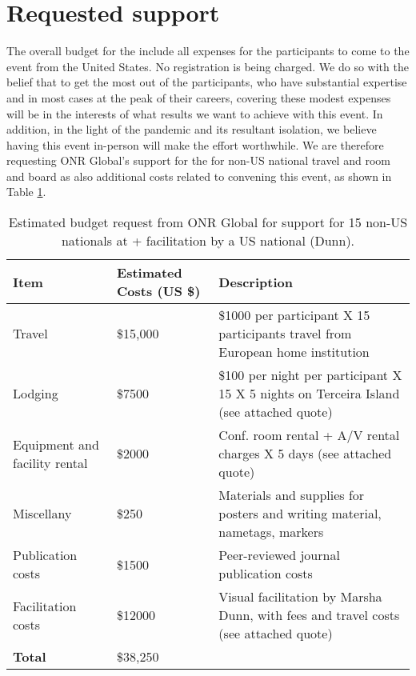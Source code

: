 \section{Requested  support}

The overall budget for the \symp include all expenses for the
participants to come to the event from the United States. No
registration is being charged. We do so with the belief that to get
the most out of the participants, who have substantial expertise and
in most cases at the peak of their careers, covering these modest
expenses will be in the interests of what results we want to achieve
with this event. In addition, in the light of the pandemic and its
resultant isolation, we believe having this event in-person will make
the effort worthwhile.  We are therefore requesting ONR Global's
support for the \symp for non-US national travel and room and board as
also additional costs related to convening this event, as shown in
Table \ref{tab:nsf-budget}.

\begin{table}[!h]
  \footnotesize{
    \centering    
    \begin{tabular}{|p{3.0cm}|p{1.6cm}|p{10cm}|}
      \hline 
      \rowcolor{Gray}
      \bfseries Item& \bfseries Estimated Costs (US \$)&\bfseries Description\\
      \hline
      Travel & \$15,000 & \$1000 per participant X 15 participants travel from European home institution \\
      \hline
      Lodging& \$7500 & \$100 per night per participant X 15 X 5
                        nights on Terceira Island (see attached quote)\\
      \hline
      Equipment and facility rental &\$2000 & Conf. room rental + A/V
                                              rental charges X 5 days
                                              (see attached quote)\\
      \hline
      Miscellany& \$250 & Materials and supplies for posters and writing material,
                          nametags, markers\\
      \hline
      Publication costs& \$1500 & Peer-reviewed journal publication
                                  costs\\
      \hline
      Facilitation costs& \$12000 & Visual facilitation by Marsha
                                    Dunn, with fees and travel
                                    costs (see attached quote)\\
      \hline
      \textbf{Total}& \$38,250&\\
      \hline        
  \end{tabular}
  \caption{Estimated budget request from ONR Global for support for 15
    non-US nationals at \sympe + facilitation by a US national (Dunn).}
  \label{tab:nsf-budget}
}
\end{table}

